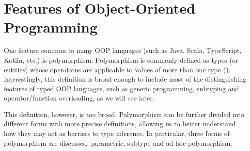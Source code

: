 \section{Features of Object-Oriented Programming}

One feature common to many OOP languages (such as Java, Scala, TypeScript, Kotlin, etc.) is polymorphism. Polymorphism is commonly defined as types (or entities) whose operations are applicable to values of more than one type (\cite{cardelli}). Interestingly, this definition is broad enough to include most of the distinguishing features of typed OOP languages, such as generic programming, subtyping and operator/function overloading, as we will see later.

This definition, however, is too broad. Polymorphism can be further divided into different forms with more precise definitions, allowing us to better understand how they may act as barriers to type inference. In particular, three forms of polymorphism are discussed: parametric, subtype and ad-hoc polymorphism.
